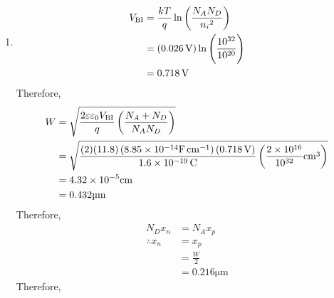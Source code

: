 \documentclass[titlepage, fleqn, a4paper, 12pt, twoside]{article}
\theoremstyle{definition}
\theoremstyle{theorem}
\begin{document}
\begin{solution}
	\begin{enumerate}[leftmargin=*]
		\item
			\begin{align*}
				V_{\text{BI}} &= \frac{k T}{q} \ln\left( \frac{N_A N_D}{{n_i}^2} \right)\\
				&= \left( 0.026 \volt \right) \ln\left( \frac{10^{32}}{10^{20}} \right)\\
				&= 0.718 \volt
			\end{align*}
			Therefore,
			\begin{align*}
				W &= \sqrt{\frac{2 \varepsilon \varepsilon_0 V_{\text{BI}}}{q} \left( \frac{N_A + N_D}{N_A N_D} \right)}\\
				&= \sqrt{\frac{(2) (11.8) \left( 8.85 \times 10^{-14} \si{\farad\per\centi\metre} \right) (0.718 \volt)}{1.6 \times 10^{-19} \coulomb} \left( \frac{2 \times 10^{16}}{10^{32}} \si{\centi\metre\cubed} \right)}\\
				&= 4.32 \times 10^{-5} \si{\centi\metre}\\
				&= 0.432 \si{\micro\metre}
			\end{align*}
			Therefore,
			\begin{align*}
				N_D x_n &= N_A x_p\\
				\therefore x_n &= x_p\\
				&= \frac{W}{2}\\
				&= 0.216 \si{\micro\metre}
			\end{align*}
			Therefore,
			\begin{figure}[H]
				\centering
\end{figure}
\end{enumerate}
\end{solution}
\end{document}
